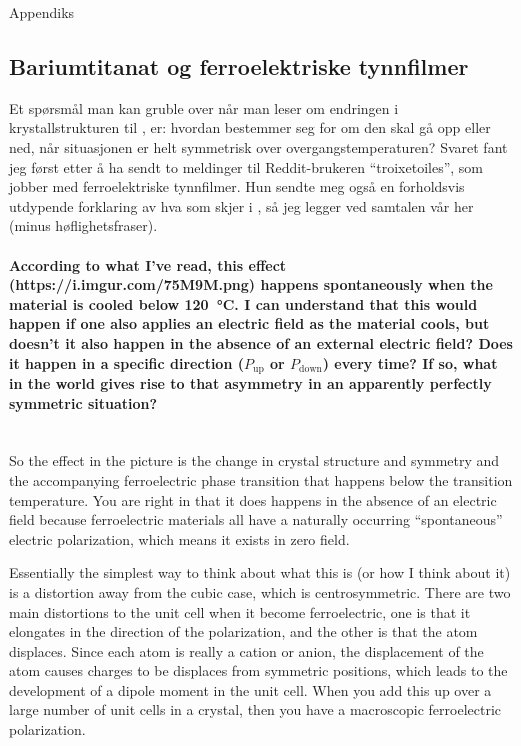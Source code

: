 \appendix
\centerline{\color{Orange}\Huge{Appendiks}}
\begin{changemargin}{2.5cm}{2.5cm}
\section{Bariumtitanat og ferroelektriske tynnfilmer}
Et spørsmål man kan gruble over når man leser om endringen i krystallstrukturen til , er: hvordan bestemmer  seg for om den skal gå opp eller ned, når situasjonen er helt symmetrisk over overgangstemperaturen? Svaret fant jeg først etter å ha sendt to meldinger til Reddit-brukeren ``troixetoiles'', som jobber med ferroelektriske tynnfilmer. Hun sendte meg også en forholdsvis utdypende forklaring av hva som skjer i , så jeg legger ved samtalen vår her (minus høflighetsfraser).

\paragraph{According to what I've read, this effect ({\ttfamily https://i.imgur.com/75M9M.png}) happens spontaneously when the material is cooled below \SI{120}{\celsius}. I can understand that this would happen if one also applies an electric field as the material cools, but doesn't it also happen in the absence of an external electric field? Does it happen in a specific direction ($P_{\text{up}}$ or $P_{\text{down}}$) every time? If so, what in the world gives rise to that asymmetry in an apparently perfectly symmetric situation?} \mbox{}\\

\noindent So the effect in the picture is the change in crystal structure and symmetry and the accompanying ferroelectric phase transition that happens below the transition temperature. You are right in that it does happens in the absence of an electric field because ferroelectric materials all have a naturally occurring ``spontaneous'' electric polarization, which means it exists in zero field.

Essentially the simplest way to think about what this is (or how I think about it) is a distortion away from the cubic case, which is centrosymmetric. There are two main distortions to the  unit cell when it become ferroelectric, one is that it elongates in the direction of the polarization, and the other is that the  atom displaces. Since each atom is really a cation or anion, the displacement of the  atom causes charges to be displaces from symmetric positions, which leads to the development of a dipole moment in the unit cell. When you add this up over a large number of unit cells in a crystal, then you have a macroscopic ferroelectric polarization.


\end{changemargin}
